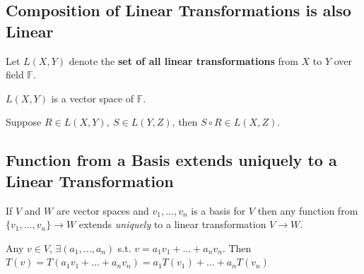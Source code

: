 \documentclass[11pt]{elegantbook}
\begin{document}
\subsection{Composition of Linear Transformations is also Linear}
Let $L(X, Y)$ denote the \textbf{set of all linear transformations} from $X$ to $Y$ over field $\mathbb{F}$.
\begin{theorem}
    $L(X,Y)$ is a vector space of $\mathbb{F}$.
\end{theorem}

\begin{proposition}
    Suppose $R\in L(X,Y),\ S\in L(Y,Z)$, then $S\circ R\in L(X,Z)$.
\end{proposition}

\subsection{Function from a Basis extends uniquely to a Linear Transformation}
\begin{proposition}[Proposition 2.4.15.]
    If $V$ and $W$ are vector spaces and $v_1,...,v_n$ is a basis for $V$ then any function
    from $\{v_1,...,v_n\}\rightarrow W$ extends \textit{uniquely} to a linear transformation $V \rightarrow W$.
\end{proposition}
Any $v\in V$, $\exists (a_1,...,a_n)$ s.t. $v=a_1 v_1+...+a_n v_n$. Then $T(v)=T(a_1 v_1+...+a_n v_n)=a_1T(v_1)+...+a_nT(v_n)$
\end{document}
